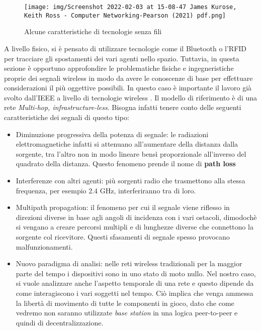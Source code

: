 \documentclass[12pt,twoside]{report}
\begin{document}
    \begin{figure}[htb]
    	\hfill\texttt{[image: img/Screenshot 2022-02-03 at 15-08-47 James Kurose, Keith Ross - Computer Networking-Pearson (2021) pdf.png]}\hfill
    	\label{fig:Adj1}
    	\caption{Alcune caratteristiche di tecnologie senza fili}
    \end{figure}
    \FloatBarrier
    
    A livello fisico, si è pensato di utilizzare tecnologie come il Bluetooth o l'RFID per tracciare gli spostamenti dei vari agenti nello spazio. Tuttavia, in questa sezione è opportuno approfondire le problematiche fisiche e ingegneristiche proprie dei segnali wireless in modo da avere le conoscenze di base per effettuare considerazioni il più oggettive possibili. In questo caso è importante il lavoro già svolto dall'IEEE a livello di tecnologie wireless \cite{Kurose2017ComputerNA}. Il modello di riferimento è di una rete \textit{Multi-hop, infrastructure-less}. Bisogna infatti tenere conto delle seguenti caratteristiche dei segnali di questo tipo:
    
    \begin{itemize}
        \item Diminuzione progressiva della potenza di segnale: le radiazioni elettromagnetiche infatti si attenuano all'aumentare della distanza dalla sorgente, tra l'altro non in modo lineare bensì proporzionale all'inverso del quadrato della distanza. Questo fenomeno prende il nome di \textbf{path loss}
        \item Interferenze con altri agenti: più sorgenti radio che trasmettono alla stessa frequenza, per esempio 2.4 GHz, interferiranno tra di loro.
        \item Multipath propagation: il fenomeno per cui il segnale viene riflesso in direzioni diverse in base agli angoli di incidenza con i vari ostacoli, dimodochè si vengano a creare percorsi multipli e di lunghezze diverse che connettono la sorgente col ricevitore. Questi sfasamenti di segnale spesso provocano malfunzionamenti.
        \item Nuovo paradigma di analisi: nelle reti wireless tradizionali per la maggior parte del tempo i dispositivi sono in uno stato di moto nullo. Nel nostro caso, si vuole analizzare anche l'aspetto temporale di una rete e questo dipende da come interagiscono i vari soggetti nel tempo. Ciò implica che venga ammessa la libertà di movimento di tutte le componenti in gioco, dato che come vedremo non saranno utilizzate \textit{base station} in una logica peer-to-peer e quindi di decentralizzazione.
    \end{itemize}
    
\end{document}
